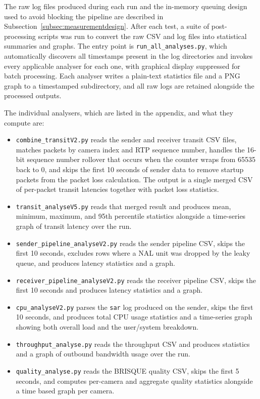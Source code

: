 The raw log files produced during each run and the in-memory queuing design used to avoid blocking the pipeline are described in Subsection~\ref{subsec:measurementdesign}. After each test, a suite of post-processing scripts was run to convert the raw CSV and log files into statistical summaries and graphs. The entry point is \texttt{run\_all\_analyses.py}, which automatically discovers all timestamps present in the log directories and invokes every applicable analyser for each one, with graphical display suppressed for batch processing. Each analyser writes a plain-text statistics file and a PNG graph to a timestamped subdirectory, and all raw logs are retained alongside the processed outputs.

The individual analysers, which are listed in the appendix, and what they compute are:

\begin{itemize}
    \item \texttt{combine\_transitV2.py} reads the sender and receiver transit CSV files, matches packets by camera index and RTP sequence number, handles the 16-bit sequence number rollover that occurs when the counter wraps from 65535 back to 0, and skips the first 10 seconds of sender data to remove startup packets from the packet loss calculation. The output is a single merged CSV of per-packet transit latencies together with packet loss statistics.
    \item \texttt{transit\_analyseV5.py} reads that merged result and produces mean, minimum, maximum, and 95th percentile statistics alongside a time-series graph of transit latency over the run.
    \item \texttt{sender\_pipeline\_analyseV2.py} reads the sender pipeline CSV, skips the first 10 seconds, excludes rows where a NAL unit was dropped by the leaky queue, and produces latency statistics and a graph.
    \item \texttt{receiver\_pipeline\_analyseV2.py} reads the receiver pipeline CSV, skips the first 10 seconds and produces latency statistics and a graph.
    \item \texttt{cpu\_analyseV2.py} parses the \texttt{sar} log produced on the sender, skips the first 10 seconds, and produces total CPU usage statistics and a time-series graph showing both overall load and the user/system breakdown.
    \item \texttt{throughput\_analyse.py} reads the throughput CSV and produces statistics and a graph of outbound bandwidth usage over the run.
    \item \texttt{quality\_analyse.py} reads the BRISQUE quality CSV, skips the first 5 seconds, and computes per-camera and aggregate quality statistics alongside a time based graph per camera.
\end{itemize}


